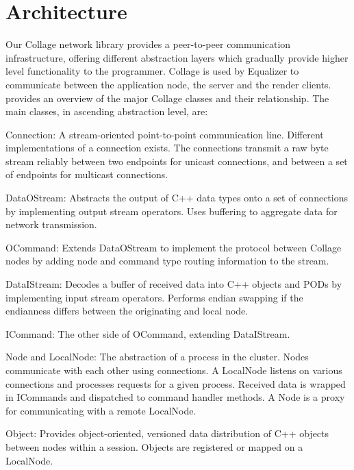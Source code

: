 \section{Architecture}

Our Collage network library provides a peer-to-peer communication
infrastructure, offering different abstraction layers which gradually provide
higher level functionality to the programmer. Collage is used by Equalizer to
communicate between the application node, the server and the render clients.
 provides an overview of the major Collage classes and their
relationship. The main classes, in ascending abstraction level, are:

\begin{compactdesc}

\item[Connection:] A stream-oriented point-to-point communication line. Different
implementations of a connection exists. The connections transmit a raw byte
stream reliably between two endpoints for unicast connections, and between a set
of endpoints for multicast connections.

\item[DataOStream:] Abstracts the output of C++ data types onto a set of
  connections by implementing output stream operators. Uses buffering to
  aggregate data for network transmission.
\item[OCommand:] Extends DataOStream to implement the protocol between Collage
  nodes by adding node and command type routing information to the stream.
\item[DataIStream:] Decodes a buffer of received data into C++ objects and PODs
  by implementing input stream operators. Performs endian swapping if the
  endianness differs between the originating and local node.
\item[ICommand:] The other side of OCommand, extending DataIStream.
\item[Node and LocalNode:] The abstraction of a process in the cluster. Nodes
  communicate with each other using connections. A LocalNode listens on various
  connections and processes requests for a given process. Received data is
  wrapped in ICommands and dispatched to command handler methods. A Node is a
  proxy for communicating with a remote LocalNode.
\item[Object:] Provides object-oriented, versioned data distribution of C++
  objects between nodes within a session. Objects are registered or mapped on a
  Local\-Node.
\end{compactdesc}

